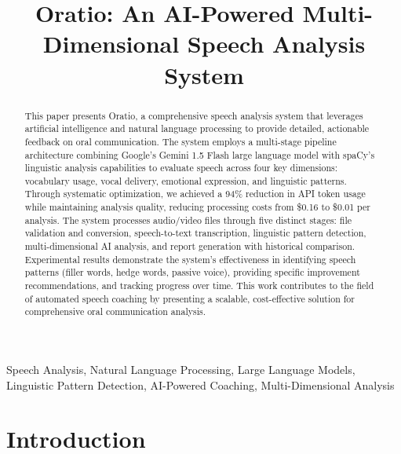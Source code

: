 \documentclass[conference]{IEEEtran}
\begin{document}
\title{Oratio: An AI-Powered Multi-Dimensional Speech Analysis System\\
{\footnotesize \textsuperscript{}}
}

\author{
}

\maketitle

\begin{abstract}
This paper presents Oratio, a comprehensive speech analysis system that leverages artificial intelligence and natural language processing to provide detailed, actionable feedback on oral communication. The system employs a multi-stage pipeline architecture combining Google's Gemini 1.5 Flash large language model with spaCy's linguistic analysis capabilities to evaluate speech across four key dimensions: vocabulary usage, vocal delivery, emotional expression, and linguistic patterns. Through systematic optimization, we achieved a 94\% reduction in API token usage while maintaining analysis quality, reducing processing costs from \$0.16 to \$0.01 per analysis. The system processes audio/video files through five distinct stages: file validation and conversion, speech-to-text transcription, linguistic pattern detection, multi-dimensional AI analysis, and report generation with historical comparison. Experimental results demonstrate the system's effectiveness in identifying speech patterns (filler words, hedge words, passive voice), providing specific improvement recommendations, and tracking progress over time. This work contributes to the field of automated speech coaching by presenting a scalable, cost-effective solution for comprehensive oral communication analysis.
\end{abstract}

\begin{IEEEkeywords}
Speech Analysis, Natural Language Processing, Large Language Models, Linguistic Pattern Detection, AI-Powered Coaching, Multi-Dimensional Analysis
\end{IEEEkeywords}

\section{Introduction}
\end{document}
